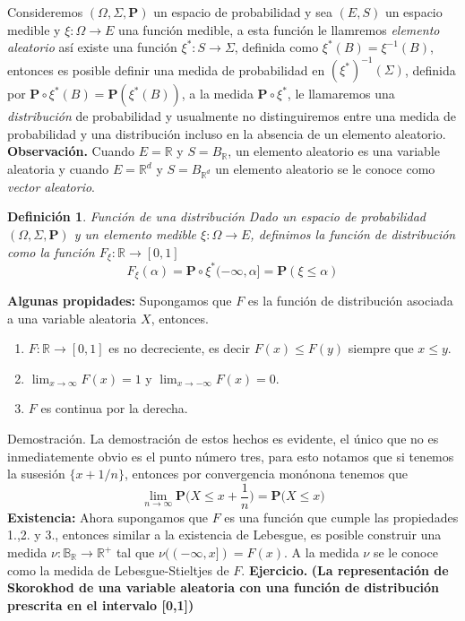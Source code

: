 \documentclass[letterpaper]{book}
\newtheorem{def.}{Definici\'on}[section]
\newcommand{\prob}{\textbf{P}}
\newcommand{\eje}{{\newline \noindent \sc \textbf{Ejercicio. }}}
\newcommand{\obs}{{\newline \noindent \sc \textbf{Observación. }}}
\newcommand{\dem}{{\noindent \sc Demostraci\'on. }}
\newcommand{\om}{\ensuremath{\Omega}}
\newcommand{\sig}{\ensuremath{\Sigma}}
\newcommand{\re}{\ensuremath{\mathbb R }}
\begin{document}
\noindent Consideremos \((\om,\sig,\prob)\) un espacio de probabilidad y sea \((E,S)\) un espacio medible y \(\xi:\om\rightarrow E\) una función medible, a esta función le llamremos \emph{elemento aleatorio} así existe una función \(\xi^{*}:S\rightarrow\sig\), definida como \(\xi^{*}(B)=\xi^{-1}(B)\), entonces es posible definir una medida de probabilidad en \((\xi^{*})^{-1}(\sig)\), definida por \(\prob\circ\xi^{*}(B)=\prob(\xi^{*}(B))\), a la medida \(\prob\circ\xi^{*}\), le llamaremos una \emph{distribución} de probabilidad y usualmente no distinguiremos entre una medida de probabilidad y una distribución incluso en la absencia de un elemento aleatorio.
\obs Cuando \(E=\re\) y \(S=B_{\re}\), un elemento aleatorio es una variable aleatoria y cuando \(E=\re^{d}\) y \(S=B_{\re^{d}}\) un elemento aleatorio se le conoce como \emph{vector aleatorio}.
\begin{def.}{Función de una distribución}
Dado un espacio de probabilidad \((\om,\sig,\prob)\) y un elemento medible \(\xi:\om\rightarrow E\), definimos la \textit{función} de distribución como la función \(F_{\xi}:\re\rightarrow[0,1]\)
\[
    F_{\xi}(\alpha)=\prob\circ\xi^{*}(-\infty,\alpha]=\prob(\xi\leq\alpha)
\]
\end{def.}
\noindent \textbf{Algunas propidades:} Supongamos que \(F\) es la función de distribución asociada a una variable aleatoria \(X\), entonces.
\begin{enumerate}
\item \(F:\re\rightarrow[0,1]\) es no decreciente, es decir \(F(x)\leq F(y)\) siempre que \(x\leq y\).
\item \(\lim_{x\rightarrow\infty}F(x)=1\) y \(\lim_{x\rightarrow -\infty}F(x)=0\).
\item \(F\) es continua por la derecha.
\end{enumerate}
\dem La demostración de estos hechos es evidente, el único que no es inmediatemente obvio es el punto número tres, para esto notamos que si tenemos la susesión \(\{x+1/n\}\), entonces por convergencia monónona tenemos que
\[
    \lim_{n\rightarrow\infty}\prob\Big(X\leq x+\frac{1}{n}\Big)=\prob\Big(X\leq x\Big)
\]
\noindent \textbf{Existencia:} Ahora supongamos que \(F\) es una función que cumple las propiedades 1.,2. y 3., entonces similar a la existencia de Lebesgue, es posible construir una medida \(\nu:\mathbb{B}_{\re}\rightarrow\re^{+}\) tal que \(\nu((-\infty,x])=F(x)\). A la medida \(\nu\) se le conoce como la medida de Lebesgue-Stieltjes de \(F\).
\eje \textbf{(La representación de Skorokhod de una variable aleatoria con una función de distribución prescrita en el intervalo [0,1])}\\
\end{document}
